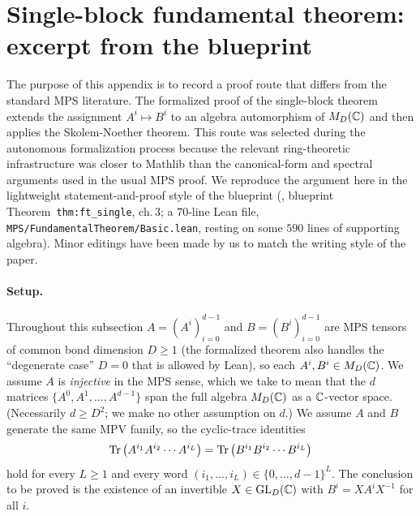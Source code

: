 \section{Single-block fundamental theorem: excerpt from the blueprint}\label{app:ftsb_walkthrough}

The purpose of this appendix is to record a proof route that differs from the standard MPS literature. The formalized proof of the single-block theorem extends the assignment $A^i\mapsto B^i$ to an algebra automorphism of $M_D(\mathbb{C})$ and then applies the Skolem-Noether theorem. This route was selected during the autonomous formalization process because the relevant ring-theoretic infrastructure was closer to Mathlib than the canonical-form and spectral arguments used in the usual MPS proof. We reproduce the argument here in the lightweight statement-and-proof style of the blueprint (, blueprint Theorem~\texttt{thm:ft\_single}, ch.\,3; a $70$-line Lean file, \texttt{MPS/FundamentalTheorem/Basic.lean}, resting on some $590$ lines of supporting algebra). Minor editings have been made by us to match the writing style of the paper.\\


\paragraph*{Setup.} Throughout this subsection $A = {(A^i)}_{i=0}^{d-1}$ and $B = {(B^i)}_{i=0}^{d-1}$ are MPS tensors of common bond dimension $D \ge 1$ (the formalized theorem also handles the ``degenerate case'' $D = 0$ that is allowed by Lean), so each $A^i, B^i \in M_D(\mathbb{C})$. We assume $A$ is \emph{injective} in the MPS sense, which we take to mean that the $d$ matrices $\{A^0, A^1, \ldots, A^{d-1}\}$ span the full algebra $M_D(\mathbb{C})$ as a $\mathbb{C}$-vector space. (Necessarily $d \ge D^2$; we make no other assumption on $d$.) We assume $A$ and $B$ generate the same MPV family, so the cyclic-trace identities
\begin{equation}\label{eq:trace_id}
    \operatorname{Tr}\left(A^{i_1} A^{i_2} \cdots A^{i_L}\right) = \operatorname{Tr}\left(B^{i_1} B^{i_2} \cdots B^{i_L}\right)
\end{equation}
hold for every $L \ge 1$ and every word ${(i_1, \ldots, i_L)} \in {\{0, \ldots, d-1\}}^L$. The conclusion to be proved is the existence of an invertible $X \in \mathrm{GL}_D(\mathbb{C})$ with $B^i = X A^i X^{-1}$ for all $i$.


